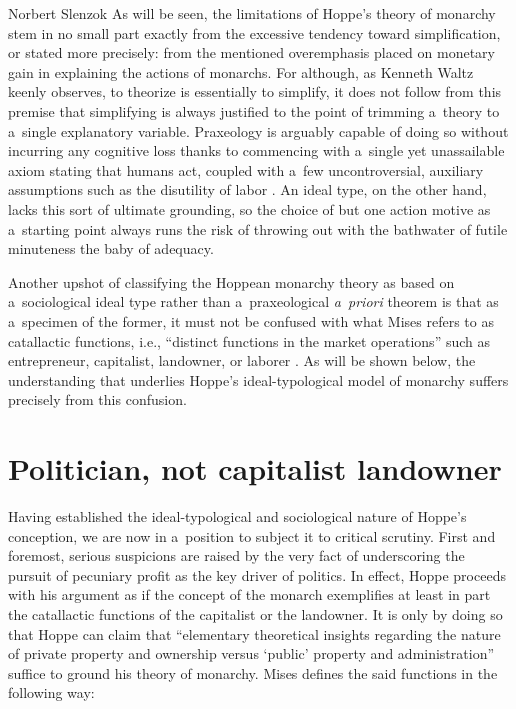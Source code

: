 \begin{artengenv}{Norbert Slenzok}
As will be seen, the limitations of Hoppe's theory of monarchy stem in no small part exactly from the excessive tendency toward simplification, or stated more precisely: from the mentioned overemphasis placed on monetary gain in explaining the actions of monarchs. For although, as Kenneth Waltz 
\parencite*[][chap. 1]{waltz_theory_1979} %
 keenly observes, to theorize is essentially to simplify, it does not follow from this premise that simplifying is always justified to the point of trimming a~theory to a~single explanatory variable. Praxeology is arguably capable of doing so without incurring any cognitive loss thanks to commencing with a~single yet unassailable axiom stating that humans act, coupled with a~few uncontroversial, auxiliary assumptions such as the disutility of labor 
\parencite[][chap. 1]{rothbard_man_2009}. %
 An ideal type, on the other hand, lacks this sort of ultimate grounding, so the choice of but one action motive as a~starting point always runs the risk of throwing out with the bathwater of futile minuteness the baby of adequacy.



Another upshot of classifying the Hoppean monarchy theory as based on a~sociological ideal type rather than a~praxeological \textit{a~priori} theorem is that as a~specimen of the former, it must not be confused with what Mises refers to as catallactic functions, i.e., ``distinct functions in the market operations'' such as entrepreneur, capitalist, landowner, or laborer 
\parencite[][p.252]{mises_human_1998}. %
 As will be shown below, the understanding that underlies Hoppe's ideal-typological model of monarchy suffers precisely from this confusion.



\section{Politician, not capitalist landowner}

Having established the ideal-typological and sociological nature of Hoppe's conception, we are now in a~position to subject it to critical scrutiny. First and foremost, serious suspicions are raised by the very fact of underscoring the pursuit of pecuniary profit as the key driver of politics. In effect, Hoppe proceeds with his argument as if the concept of the monarch exemplifies at least in part the catallactic functions of the capitalist or the landowner. It is only by doing so that Hoppe can claim that ``elementary theoretical insights regarding the nature of private property and ownership versus ‘public' property and administration'' suffice to ground his theory of monarchy. Mises 
\parencite*[][p.255]{mises_human_1998} %
 defines the said functions in the following way:




\end{artengenv}
